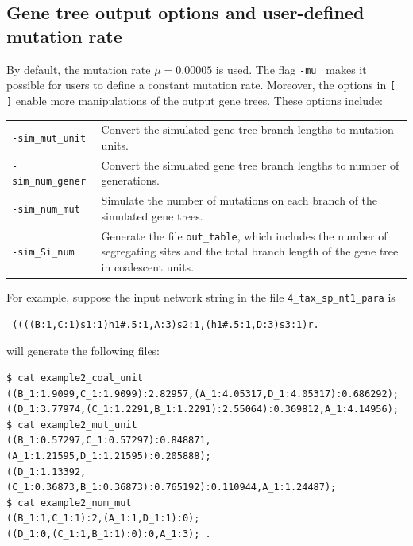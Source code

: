\subsection{Gene tree output options and user-defined mutation rate}
By default, the mutation rate $\mu=0.00005$ is used. The flag {\tt -mu } makes it possible for users to define a constant mutation rate. Moreover, the options in {\tt [ ]} enable more manipulations of the output gene trees. These options include:
\begin{longtable}{lp{9cm}}
{\tt -sim\_mut\_unit }& Convert the simulated gene tree branch lengths to mutation units.\\
{\tt -sim\_num\_gener }& Convert the simulated gene tree branch lengths to number of generations.\\
{\tt -sim\_num\_mut }& Simulate the number of mutations on each branch of the simulated gene trees.\\
{\tt -sim\_Si\_num }&  Generate the file {\tt out\_table}, which includes the number of segregating sites and the total branch length of the gene tree in coalescent units.\\
\end{longtable}

For example, suppose the input network string in the file {\tt 4\_tax\_sp\_nt1\_para} is %
\begin{verbatim}
 ((((B:1,C:1)s1:1)h1#.5:1,A:3)s2:1,(h1#.5:1,D:3)s3:1)r.
\end{verbatim}

will generate the following files:
\begin{verbatim}
$ cat example2_coal_unit
((B_1:1.9099,C_1:1.9099):2.82957,(A_1:4.05317,D_1:4.05317):0.686292);
((D_1:3.77974,(C_1:1.2291,B_1:1.2291):2.55064):0.369812,A_1:4.14956);
$ cat example2_mut_unit
((B_1:0.57297,C_1:0.57297):0.848871,(A_1:1.21595,D_1:1.21595):0.205888);
((D_1:1.13392,(C_1:0.36873,B_1:0.36873):0.765192):0.110944,A_1:1.24487);
$ cat example2_num_mut
((B_1:1,C_1:1):2,(A_1:1,D_1:1):0);
((D_1:0,(C_1:1,B_1:1):0):0,A_1:3); .
\end{verbatim}

